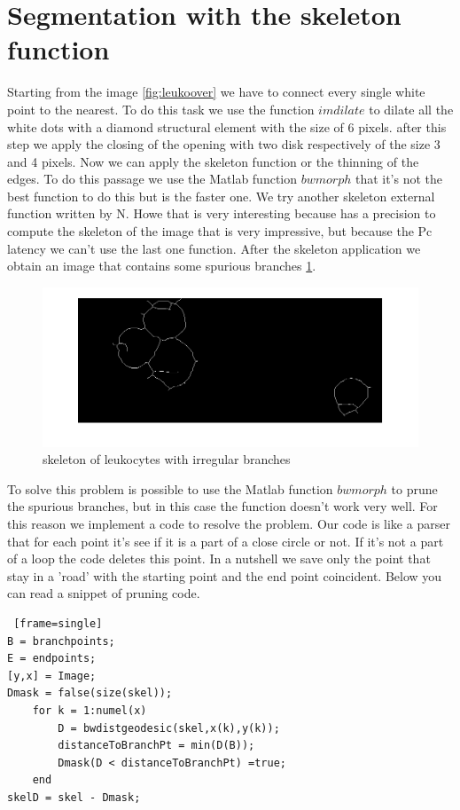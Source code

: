 \section{Segmentation with the skeleton function}
Starting from the image \ref{fig:leukoover} we have to connect every single white point to the nearest. To do this task we use the function $imdilate$ to dilate all the white dots with a diamond structural element with the size of 6 pixels. after this step we apply the closing of the opening with two disk respectively of the size 3 and 4 pixels. Now we can apply the skeleton function or the thinning of the edges. To do this passage we use the Matlab function $bwmorph$ that it's not the best function to do this but is the faster one. We try another skeleton external function written by N. Howe that is very interesting because has a precision to compute the skeleton of the image that is very impressive, but because the Pc latency we can't use the last one function. After the skeleton application we obtain an image that contains some spurious branches \ref{fig:skel}. 
\begin{figure}
	\begin{center}
		\centering
		\includegraphics[scale=0.5]{img/skel.png}
		\caption{skeleton of leukocytes with irregular branches}
		\label{fig:skel}
	\end{center}
\end{figure}
To solve this problem is possible to use the Matlab function $bwmorph$ to prune the spurious branches, but in this case the function doesn’t work very well. For this reason we implement a code to resolve the problem. Our code is like a parser that for each point it's see if it is a part of a close circle or not. If it's not a part of a loop the code deletes this point. In a nutshell we save only the point that stay in a 'road' with the starting point and the end point coincident. Below you can read a snippet of pruning code.
\begin{scriptsize}
	\begin{lstlisting} [frame=single]
B = branchpoints;
E = endpoints;
[y,x] = Image;
Dmask = false(size(skel));
	for k = 1:numel(x)
    	D = bwdistgeodesic(skel,x(k),y(k));
    	distanceToBranchPt = min(D(B));
    	Dmask(D < distanceToBranchPt) =true;
	end
skelD = skel - Dmask;
	\end{lstlisting}
\end{scriptsize}

